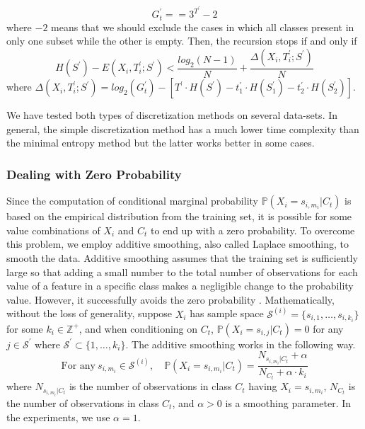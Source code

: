 \documentclass[twoside,11pt]{article}
\begin{document}
\begin{equation*}
G_t^\prime==3^{T^\prime}-2
\end{equation*}
where $-2$ means that we should exclude the cases in which all classes present in only one subset while the other is empty. Then, the recursion stops if and only if
\begin{equation*}
H(S^\prime)-E(X_i,T_i^\prime;S^\prime)<\frac{log_2(N-1)}{N}+\frac{\Delta(X_i,T_i^\prime;S^\prime)}{N}
\end{equation*}
where $\Delta(X_i,T_i^\prime;S^\prime)=log_2(G_t^\prime)-[T^\prime\cdot H(S^\prime)-t_1^\prime\cdot H(S_1^\prime)-t_2^\prime\cdot H(S_2^\prime)]$.

We have tested both types of discretization methods on several data-sets. In general, the simple discretization method has a much lower time complexity than the minimal entropy method but the latter works better in some cases.

\subsubsection{Dealing with Zero Probability}\label{zero_prob}
Since the computation of conditional marginal probability $\mathbb{P}(X_i=s_{i,m_i}|C_t)$ is based on the empirical distribution from the training set, it is possible for some value combinations of $X_i$ and $C_t$ to end up with a zero probability. To overcome this problem, we employ additive smoothing, also called Laplace smoothing, to smooth the data. Additive smoothing assumes that the training set is sufficiently large so that adding a small number to the total number of observations for each value of a feature in a specific class makes a negligible change to the probability value. However, it successfully avoids the zero probability \citep{han2011data}. Mathematically, without the loss of generality, suppose $X_i$ has sample space $\mathcal{S}^{(i)}=\{s_{i,1},\dots,s_{i,k_i}\}$ for some $k_i\in \mathbb{Z}^{+}$, and when conditioning on $C_t$, $\mathbb{P}(X_i=s_{i,j}|C_t)=0$ for any $j\in \mathcal{S}^{'}$ where $\mathcal{S}^{'}\subset \{1,\dots,k_i\}$. The additive smoothing works in the following way.
\begin{displaymath}
\text{For any}\ s_{i,m_i}\in \mathcal{S}^{(i)}, \quad \mathbb{P}(X_i=s_{i,m_i}|C_t)=\frac{N_{s_{i,m_i}|C_t}+\alpha}{N_{C_t}+\alpha\cdot k_i}
\end{displaymath}
where $N_{s_{i,m_i}|C_t}$ is the number of observations in class $C_t$ having $X_i=s_{i,m_i}$, $N_{C_t}$ is the number of observations in class $C_t$, and $\alpha >0$ is a smoothing parameter. In the experiments, we use $\alpha =1$.
\end{document}
